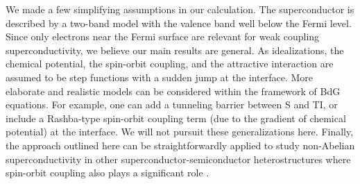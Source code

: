 We made a few simplifying assumptions in our calculation. The superconductor is described 
by a two-band model with the valence band well below the Fermi level. Since only 
electrons near the Fermi surface are relevant for weak coupling superconductivity, we 
believe our main results are general. As idealizations, the chemical 
potential, the spin-orbit coupling, and the attractive interaction are assumed to be 
step functions with a sudden jump at the interface. 
More elaborate and realistic models can be considered within the framework of BdG equations.
For example, one can add a tunneling barrier between S and TI, 
or include a Rashba-type spin-orbit coupling term 
(due to the gradient of chemical potential) at the interface. We will not 
pursuit these generalizations here.
Finally, the approach outlined here can be straightforwardly applied to 
study non-Abelian superconductivity in other superconductor-semiconductor
heterostructures where spin-orbit coupling also plays a significant role
\cite{roman,maryland,jason,mao1,mao2}.


